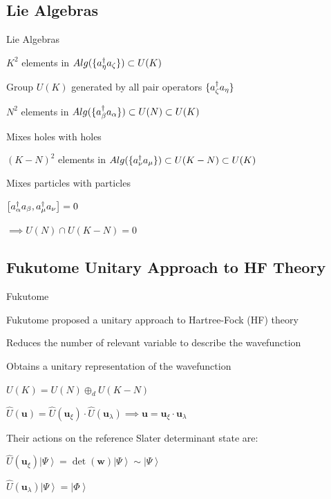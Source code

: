 \documentclass[professionalfonts]{beamer}
\newcommand{\ket}[1]{\ensuremath{\left|#1\right\rangle}}
\newcommand{\elec}{N}
\newcommand{\orb}{K}
\newcommand{\anio}[1]{a_{\oo{#1}}}
\newcommand{\aniu}[1]{a_{\uo{#1}}}
\newcommand{\anig}[1]{a_{\go{#1}}}
\newcommand{\creo}[1]{a^\dagger_{\oo{#1}}}
\newcommand{\creu}[1]{a^\dagger_{\uo{#1}}}
\newcommand{\creg}[1]{a^\dagger_{\go{#1}}}
\newcommand{\uo}[1]{
		\IfEqCase{#1}{
			{0}{\mu}
			{1}{\nu}
			{2}{\xi}
		}[\PackageError{uo}{Undefined option to uo: #1}{}]
}
\newcommand{\oo}[1]{
		\IfEqCase{#1}{
			{0}{\alpha}
			{1}{\beta}
			{2}{\gamma}
		}[\PackageError{unocorb}{Undefined option to unuo: #1}{}]
}
\newcommand{\go}[1]{
		\IfEqCase{#1}{
			{0}{\zeta}
			{1}{\eta}
			{2}{\iota}
			{3}{\kappa}
		}[\PackageError{unocorb}{Undefined option to go: #1}{}]
}
\newcommand{\SubItem}[1]{
    {\setlength\itemindent{15pt} \item[*] #1}
}
\begin{document}


\subsection{\textbf{Lie Algebras}}

\begin{frame}{Lie Algebras}
	\begin{itemize}
		\item $\orb^2$ elements in $Alg(\{\creg 1 \anig 0\}) \subset U(\orb)$
			\SubItem{Group $U(\orb)$ generated by all pair operators $\{\creg 0 \anig 1 \}$}
		\item $\elec^2$ elements in $Alg(\{\creo 1 \anio 0\}) \subset U(\elec) \subset U(\orb)$
			\SubItem{Mixes holes with holes}
		\item $(\orb - \elec)^2$ elements in $Alg(\{\creu 1 \aniu 0\}) \subset U(\orb - \elec) \subset U(\orb)$
			\SubItem{Mixes particles with particles}
			\SubItem{$\left[\creo 0 \anio 1, \creu 0 \aniu 1\right] = 0$}
			\SubItem{$\implies {U(\elec) \cap U(\orb - \elec) = 0}$}
	\end{itemize}
\end{frame}



\subsection {\textbf{Fukutome Unitary Approach to HF Theory}}

\begin{frame}{Fukutome}
	\begin{itemize}
		\item Fukutome proposed a unitary approach to Hartree-Fock (HF) theory \citep{fukutome}
			\SubItem{Reduces the number of relevant variable to describe the wavefunction}
			\SubItem{Obtains a unitary representation of the wavefunction}
		\item $U(\orb) = U(\elec) \oplus_d U(\orb - \elec)$
			\SubItem{
			\(
				\hat U(\bm u) = 
				\hat U(\bm u_\xi) \cdot 
				\hat U(\bm u_\lambda) \implies 
				\bm u = 
				\bm u_\xi \cdot 
				\bm u_\lambda
				\)
			}
		\item Their actions on the reference Slater determinant state are:
			\SubItem{
				\(
					\hat U(\bm u_\xi) \ket\Psi
					= \det(\bm w)\ket\Psi \sim \ket \Psi
				\)
			}
			\SubItem{
				\(
					\hat U(\bm u_\lambda) \ket\Psi
					= \ket\Phi
				\)
			}
	\end{itemize}
\end{frame}
\end{document}
